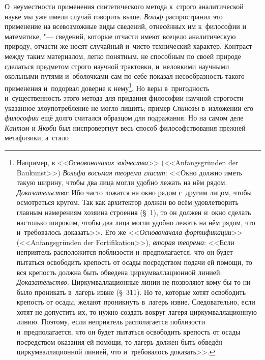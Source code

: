 О~неуместности применения синтетического метода к~строго
аналитической науке мы уже имели случай говорить выше.
{\em Вольф} распространил
это применение на всевозможные виды сведений, отнесённых им к~философии и
математике, "--- сведений, которые отчасти имеют всецело
аналитическую природу, отчасти же носят случайный и~чисто технический
характер. Контраст между таким материалом, легко понятным, не способным по
своей природе сделаться предметом строго научной трактовки, и~неловкими
научными окольными путями и~оболочками сам по себе показал
несообразность такого применения и~подорвал доверие к
нему\footnote{Например, в <<{\em Основоначалах зодчества}>>
(<<Anfangs\-gründen der Bau\-kunst>>) {\em Вольфа восьмая теорема гласит}:
<<Окно должно иметь такую ширину, чтобы два лица
могли удобно лежать на нём рядом. {\em Доказательство}:
Ибо часто ложатся на окно рядом с~другим лицом, чтобы
осмотреться кругом. Так как архитектор должен во всём удовлетворить главным
намерениям хозяина строения (\S~1), то он должен и~окно сделать настолько
широким, чтобы два лица могли удобно лежать на нём рядом, что и~требовалось
доказать>>. Его же <<{\em Основоначала фортификации}>>
(<<Anfangs\-grün\-den der For\-tifika\-tion>>), {\em вторая теорема}:
<<Если неприятель расположится поблизости и~предполагается,
что он будет пытаться освободить крепость от осады посредством подачи ей
помощи, то вся крепость должна быть обведена циркумваллационной
линией. {\em Доказательство}.
Циркумваллационные линии не позволяют кому бы то ни было
проникать в~лагерь извне (\S~311). Но те, которые хотят освободить крепость
от осады, желают проникнуть в~лагерь извне. Следовательно, если хотят не
допустить их, то нужно создать вокруг лагеря циркумваллационную линию.
Поэтому, если неприятель располагается поблизости и~предполагается, что он
будет пытаться освободить крепость от осады посредством оказания ей помощи,
то лагерь должен быть обведён циркумваллационной линией, что и~требовалось
доказать>>.}. Но веры в~пригодность и~существенность этого
метода для придания философии научной строгости указанное злоупотребление
не могло лишить; пример {\em Спинозы}
в~изложении его
{\em философии} ещё долго
считался образцом для подражания. Но на самом деле
{\em Кантом} и
{\em Якоби} был
ниспровергнут весь способ философствования прежней метафизики, а~стало
